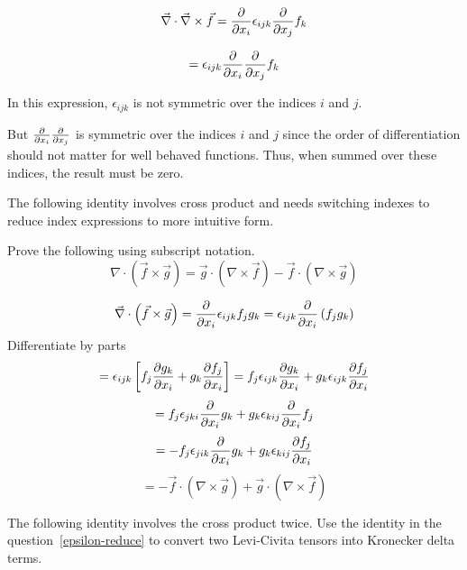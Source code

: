 \begin{solution}[print]
$$ \vec{\nabla} \cdot \vec{\nabla} \times \vec{f} = {\partial \over \partial x_i} \epsilon_{ijk} {\partial \over \partial x_j} f_k $$

$$ = \epsilon_{ijk} {\partial \over \partial x_i} {\partial \over \partial x_j} f_k$$

In this expression, $\epsilon_{ijk}$ is not symmetric over the indices $i$ and $j$.

But $ {\partial \over \partial x_i} {\partial \over \partial x_j}$ is symmetric over the indices $i$ and $j$ since the order of differentiation should not matter for well behaved functions.
Thus, when summed over these indices, the result must be zero.

\end{solution}


The following identity involves cross product and needs switching indexes to reduce index expressions to more intuitive form.

\begin{question}
Prove the following using subscript notation.
$$\nabla\cdot(\vec{f}\times\vec{g}) = \vec{g}\cdot(\nabla\times\vec{f}) - \vec{f}\cdot(\nabla\times\vec{g})$$
\end{question} 

\begin{solution}[print]
$$ \vec{\nabla} \cdot \left( \vec{f} \times \vec{g} \right) = {\partial \over \partial x_i} \epsilon_{ijk} f_j g_k = \epsilon_{ijk} {\partial \over \partial x_i} \left( f_j g_k \right) $$
Differentiate by parts
$$ = \epsilon_{ijk} \left[ f_j {\partial g_k \over \partial x_i} + g_k {\partial f_j \over \partial x_i} \right] = f_j \epsilon_{ijk} {\partial g_k \over \partial x_i} + g_k \epsilon_{ijk} {\partial f_j \over \partial x_i} $$
$$ = f_j \epsilon_{jki} {\partial \over \partial x_i} g_k + g_k \epsilon_{kij} {\partial \over \partial x_i} f_j $$
$$ = - f_j \epsilon_{jik} {\partial \over \partial x_i} g_k + g_k \epsilon_{kij} {\partial f_j \over \partial x_i} $$
$$ = - \vec{f}\cdot(\nabla\times\vec{g}) + \vec{g}\cdot(\nabla\times\vec{f}) $$
\end{solution}


The following identity involves the cross product twice. Use the identity in the question~\ref{epsilon-reduce} to convert two Levi-Civita tensors into Kronecker delta terms.

